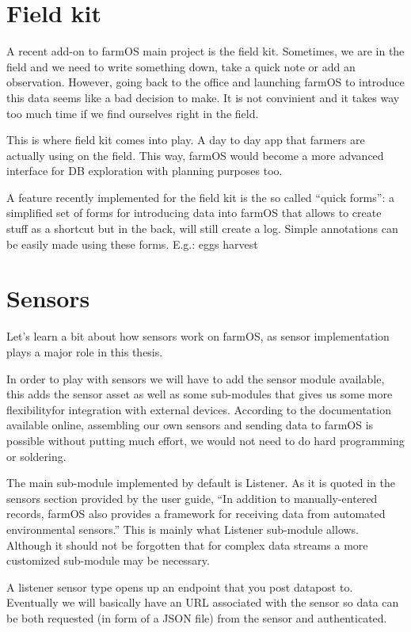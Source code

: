 \section{Field kit}
A recent add-on to farmOS main project is the field kit\cite{farmos-fieldkit}. Sometimes, we are in the field and we need to write something down, take a quick note or add an observation. However, going back to the office and launching farmOS to introduce this data seems like a bad decision to make. It is not convinient and it takes way too much time if we find ourselves right in the field.

This is where field kit comes into play. A day to day app that farmers are actually using on the field. This way, farmOS would become a more advanced interface for DB exploration with planning purposes too.

A feature recently implemented for the field kit is the so called ``quick forms'': a simplified set of forms for introducing data into farmOS that allows to create stuff as a shortcut but in the back, will still create a log. Simple annotations can be easily made using these forms. E.g.: eggs harvest

\section{Sensors}
Let's learn a bit about how sensors work on farmOS, as sensor implementation plays a major role in this thesis.

In order to play with sensors we will have to add the sensor module available, this adds the sensor asset as well as some sub-modules that gives us some more flexibilityfor integration with external devices. According to the documentation available online, assembling our own sensors and sending data to farmOS is possible without putting much effort, we would not need to do hard programming or soldering.

The main sub-module implemented by default is Listener. As it is quoted in the sensors section provided by the user guide, ``In addition to manually-entered records, farmOS also provides a framework for receiving data from automated environmental sensors.'' This is mainly what Listener sub-module allows. Although it should not be forgotten that for complex data streams a more customized sub-module may be necessary.

A listener sensor type opens up an endpoint that you post datapost to. Eventually we will basically have an URL associated with the sensor so data can be both requested (in form of a JSON file) from the sensor and authenticated.

